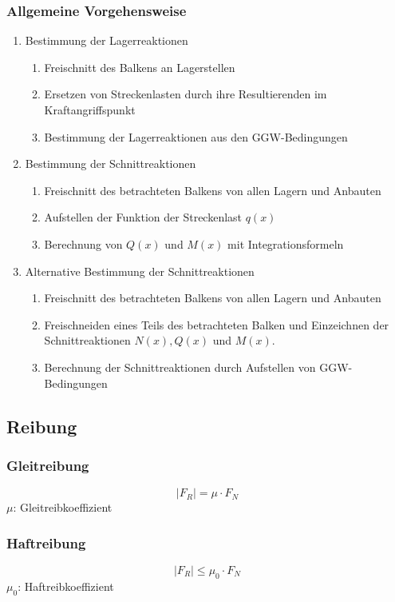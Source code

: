 \documentclass[a4paper,twocolumn,10pt]{article}
\begin{document}
\subsubsection{Allgemeine Vorgehensweise}
\begin{enumerate}
\item Bestimmung der Lagerreaktionen
\begin{enumerate}
\item Freischnitt des Balkens an Lagerstellen
\item Ersetzen von Streckenlasten durch ihre Resultierenden im Kraftangriffspunkt
\item Bestimmung der Lagerreaktionen aus den GGW-Bedingungen
\end{enumerate}
\item Bestimmung der Schnittreaktionen
\begin{enumerate}
\item Freischnitt des betrachteten Balkens von allen Lagern und Anbauten
\item Aufstellen der Funktion der Streckenlast $q(x)$
\item Berechnung von $Q(x)$ und $M(x)$ mit Integrationsformeln
\end{enumerate}
\item Alternative Bestimmung der Schnittreaktionen
\begin{enumerate}
\item Freischnitt des betrachteten Balkens von allen Lagern und Anbauten
\item Freischneiden eines Teils des betrachteten Balken und Einzeichnen der Schnittreaktionen $N(x),Q(x)$ und $M(x)$.
\item Berechnung der Schnittreaktionen durch Aufstellen von GGW-Bedingungen
\end{enumerate}
\end{enumerate}

\subsection{Reibung}

\subsubsection{Gleitreibung}
\begin{equation*}
|F_R|=\mu\cdot F_N
\end{equation*}
$\mu$: Gleitreibkoeffizient

\subsubsection{Haftreibung}
\begin{equation*}
|F_R|\leq \mu_0\cdot F_N
\end{equation*}
$\mu_0$: Haftreibkoeffizient
\end{document}
